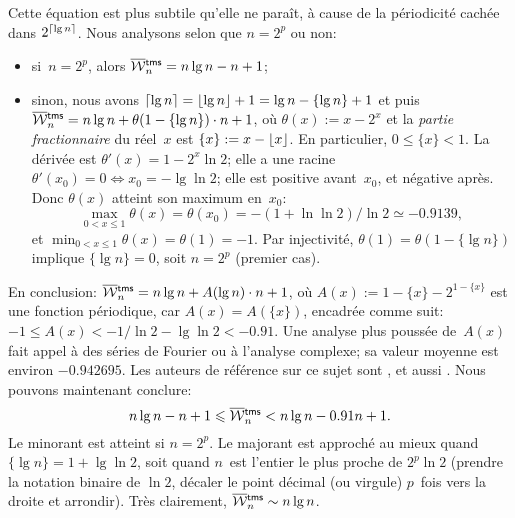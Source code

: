 Cette équation est plus subtile qu'elle ne paraît, à cause de la
périodicité cachée dans \(2^{\lceil{\lg n}\rceil}\). Nous analysons selon
que \(n = 2^p\) ou non:
\begin{itemize}

  \item si~\(n=2^p\), alors \(\OW{\fun{tms}}{n} = n\lg n - n + 1\);

  \item sinon, nous avons \(\lceil{\lg n}\rceil = \lfloor{\lg n}\rfloor + 1 = \lg
    n - \{\lg n\} + 1\) et puis \(\OW{\fun{tms}}{n} = n\lg n +
    \theta(1 - \{\lg n\}) \cdot n + 1\), où \(\theta(x) := x - 2^x\)
    et la \emph{partie fractionnaire} du réel~\(x\) est \(\{x\} := x - \lfloor{x}\rfloor\). En
    particulier, \(0 \leqslant \{x\} < 1\). La dérivée est
    \(\theta'(x) = 1 - 2^x\ln 2\); elle a une racine \(\theta'(x_0) =
    0 \Leftrightarrow x_0 = -\lg\ln 2\); elle est positive
    avant~\(x_0\), et négative après.  Donc \(\theta(x)\) atteint son
    maximum en~\(x_0\):
    \begin{equation*}
      \max_{0<x\leqslant 1}\theta(x) = \theta(x_0)
      = -(1+\ln\ln{2})/\!\ln{2} \simeq -0.9139,
    \end{equation*}
    et \(\min_{0<x\leqslant 1}\theta(x) = \theta(1) = -1\). Par
    injectivité, \(\theta(1) = \theta(1-\{\lg n\})\) implique \(\{\lg
    n\} = 0\), soit \(n=2^p\) (premier cas).
\end{itemize}
En conclusion: \(\OW{\fun{tms}}{n} = n\lg n + A(\lg n) \cdot n + 1\),
où \(A(x) := 1 - \{x\} - 2^{1 - \{x\}}\) est une fonction périodique,
car \(A(x) = A(\{x\})\), encadrée comme suit: \(-1 \leqslant A(x) <
-1/\!\ln 2 - \lg\ln 2 < -0.91\). Une analyse plus poussée de~\(A(x)\)
fait appel à des séries de Fourier ou à l'analyse complexe; sa valeur
moyenne est environ \(-0.942695\). Les auteurs de référence sur ce
sujet sont \cite{FlajoletGolin_1994}, et aussi
\cite{PannyProdinger_1995}. Nous pouvons maintenant conclure:
\begin{equation}
n\lg n - n + 1 \leqslant \OW{\fun{tms}}{n} <
n\lg n - 0.91 n + 1.\label{ineq:OWtms}
\end{equation}
Le minorant est atteint si \(n=2^p\). Le majorant est approché au
mieux quand \(\{\lg n\} = 1 + \lg\ln 2\), soit quand \(n\)~est
l'entier le plus proche de \(2^p\ln 2\) (prendre la notation binaire
de \(\ln 2\), décaler le point décimal (ou virgule) \(p\)~fois vers la
droite et arrondir). Très clairement, \(\OW{\fun{tms}}{n} \sim n\lg
n\). 

